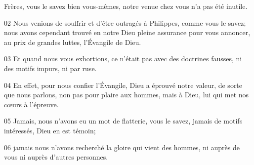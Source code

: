 Frères, vous le savez bien vous-mêmes, notre venue chez vous n’a pas été inutile.

02 Nous venions de souffrir et d’être outragés à Philippes, comme vous le savez; nous avons cependant trouvé en notre Dieu pleine assurance pour vous annoncer, au prix de grandes luttes, l’Évangile de Dieu.

03 Et quand nous vous exhortions, ce n’était pas avec des doctrines fausses, ni des motifs impurs, ni par ruse.

04 En effet, pour nous confier l’Évangile, Dieu a éprouvé notre valeur, de sorte que nous parlons, non pas pour plaire aux hommes, mais à Dieu, lui qui met nos cœurs à l’épreuve.

05 Jamais, nous n’avons eu un mot de flatterie, vous le savez, jamais de motifs intéressés, Dieu en est témoin;

06 jamais nous n’avons recherché la gloire qui vient des hommes, ni auprès de vous ni auprès d’autres personnes.